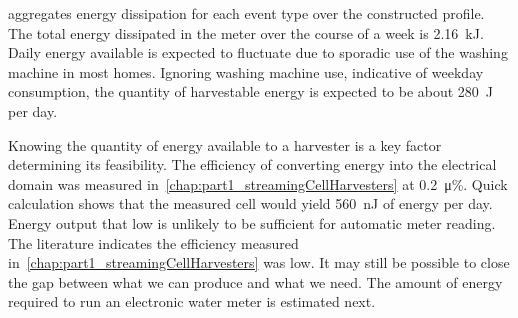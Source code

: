     aggregates energy dissipation for each event type over the constructed profile.
    The total energy dissipated in the meter over the course of a week is \SI{2.16}{\kilo\joule}.
    Daily energy available is expected to fluctuate due to sporadic use of the washing machine in most homes.
    Ignoring washing machine use, indicative of weekday consumption, the quantity of harvestable energy is expected to be about \SI{280}{\joule} per day.

    Knowing the quantity of energy available to a harvester is a key factor determining its feasibility.
    The efficiency of converting energy into the electrical domain was measured in~\cref{chap:part1_streamingCellHarvesters} at \SI{0.2}{\micro\percent}.
    Quick calculation shows that the measured cell would yield \SI{560}{\nano\joule} of energy per day.
    Energy output that low is unlikely to be sufficient for automatic meter reading.
    The literature indicates the efficiency measured in~\cref{chap:part1_streamingCellHarvesters} was low.
    It may still be possible to close the gap between what we can produce and what we need.
    The amount of energy required to run an electronic water meter is estimated next.


